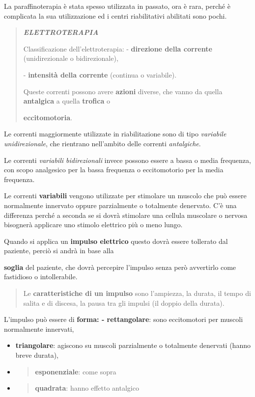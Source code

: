 \documentclass[]{article}
\begin{document}
La paraffinoterapia è stata spesso utilizzata in passato, ora è rara,
perché è complicata la sua utilizzazione ed i centri riabilitativi
abilitati sono pochi.

\begin{quote}
\textbf{\emph{ELETTROTERAPIA}}

Classificazione dell'elettroterapia: - \textbf{direzione della corrente}
(unidirezionale o bidirezionale),

- \textbf{intensità della corrente} (continua o variabile).

Queste correnti possono avere \textbf{azioni} diverse, che vanno da
quella \textbf{antalgica} a quella \textbf{trofica} o

\textbf{eccitomotoria}.
\end{quote}

Le correnti maggiormente utilizzate in riabilitazione sono di tipo
\emph{variabile unidirezionale}, che rientrano nell'ambito delle
correnti \emph{antalgiche}.

Le correnti \emph{variabili bidirezionali} invece possono essere a bassa
o media frequenza, con scopo analgesico per la bassa frequenza o
eccitomotorio per la media frequenza.

Le correnti \textbf{variabili} vengono utilizzate per stimolare un
muscolo che può essere normalmente innervato oppure parzialmente o
totalmente denervato. C'è una differenza perché a seconda se si dovrà
stimolare una cellula muscolare o nervosa bisognerà applicare uno
stimolo elettrico più o meno lungo.

Quando si applica un \textbf{impulso elettrico} questo dovrà essere
tollerato dal paziente, perciò si andrà in base alla

\textbf{soglia} del paziente, che dovrà percepire l'impulso senza però
avvertirlo come fastidioso o intollerabile.

\begin{quote}
Le \textbf{caratteristiche di un impulso} sono l'ampiezza, la durata, il
tempo di salita e di discesa, la pausa tra gli impulsi (il doppio della
durata).
\end{quote}

L'impulso può essere di \textbf{forma: - rettangolare}: sono
eccitomotori per muscoli normalmente innervati,

\begin{itemize}
\item
  \textbf{triangolare}: agiscono su muscoli parzialmente o totalmente
  denervati (hanno breve durata),
\item
  \begin{quote}
  \textbf{esponenziale}: come sopra
  \end{quote}
\item
  \begin{quote}
  \textbf{quadrata}: hanno effetto antalgico
  \end{quote}
\end{itemize}
\end{document}
